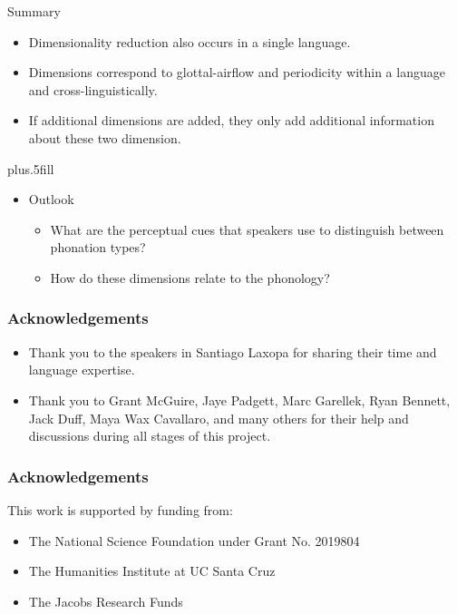 \documentclass{beamer}
\begin{document}
\begin{frame}{Summary}

  \begin{itemize}
  \item Dimensionality reduction also occurs in a single language.
  \item Dimensions correspond to glottal-airflow and periodicity within a language and cross-linguistically.
  \item If additional dimensions are added, they only add additional information about these two dimension.
  \end{itemize}
  
  \vskip0pt plus.5fill
  \begin{itemize}
  \item
    Outlook
    \begin{itemize}
    \item What are the perceptual cues that speakers use to distinguish between phonation types?
    \item How do these dimensions relate to the phonology?
    \end{itemize}
  \end{itemize}
\end{frame}

\begin{frame}
  \frametitle{Acknowledgements}
  \begin{itemize}
    \item Thank you to the speakers in Santiago Laxopa for sharing their time and language expertise. 
    \item Thank you to Grant McGuire, Jaye Padgett, Marc Garellek, Ryan Bennett, Jack Duff, Maya Wax Cavallaro, and many others for their help and discussions during all stages of this project. 
  \end{itemize}
\end{frame}

\begin{frame}
  \frametitle{Acknowledgements}
  This work is supported by funding from: 
  \begin{itemize}
    \item The National Science Foundation under Grant No. 2019804
    \item The Humanities Institute at UC Santa Cruz 
    \item The Jacobs Research Funds
  \end{itemize}

\end{frame}
\end{document}

